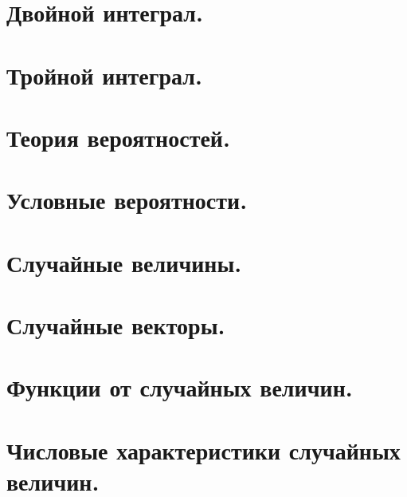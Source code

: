 \documentclass[a4paper]{article}
\begin{document}
\tableofcontents
{}

\newpage
\section{Двойной интеграл.} 



\newpage
\section{Тройной интеграл.} 
 


\newpage
\section{Теория вероятностей.}



\newpage
\section{Условные вероятности.}



\newpage
\section{Случайные величины.}



\newpage
\section{Случайные векторы.}



\newpage
\section{Функции от случайных величин.}



\newpage
\section{Числовые характеристики случайных величин.}

\end{document}
